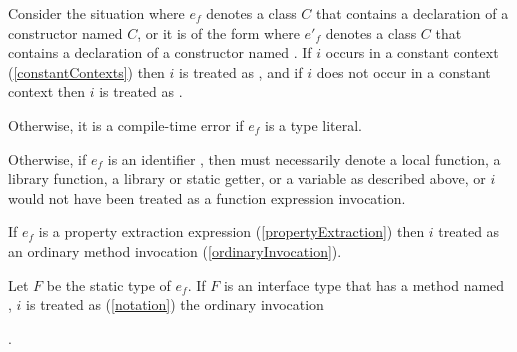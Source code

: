 \documentclass[makeidx]{article}
\begin{document}
{\LMHash{}%
Consider the situation where $e_f$ denotes a class $C$
that contains a declaration of a constructor named $C$,
or it is of the form  where
$e'_f$ denotes a class $C$ that contains a declaration of
a constructor named .
If $i$ occurs in a constant context
(\ref{constantContexts})
then $i$ is treated as ,
and if $i$ does not occur in a constant context
then $i$ is treated as .


\LMHash{}%
Otherwise, it is a compile-time error if $e_f$ is a type literal.


\LMHash{}%
Otherwise, if $e_f$ is an identifier \id, then \id{} must necessarily denote
a local function, a library function, a library or static getter,
or a variable as described above,
or $i$ would not have been treated as a function expression invocation.

\LMHash{}%
If $e_f$ is a property extraction expression
(\ref{propertyExtraction})
then $i$ treated as an ordinary method invocation
(\ref{ordinaryInvocation}).


\LMHash{}%
Let $F$ be the static type of $e_f$.
If $F$ is an interface type that has a method named \CALL,
$i$ is treated as
(\ref{notation})
the ordinary invocation

\noindent
{}.

}
\end{document}
